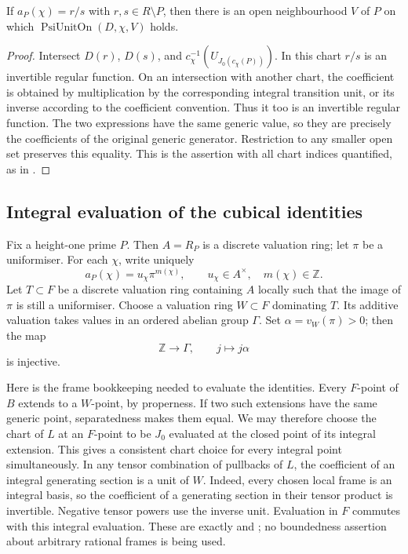 \begin{srlemma}
\label{lem:psi-near-unit}
If \(a_P(\chi)=r/s\) with \(r,s\in R\setminus P\), then there is an
open neighbourhood \(V\) of \(P\) on which
\(\operatorname{PsiUnitOn}(D,\chi,V)\) holds.
\end{srlemma}
\begin{proof}
Intersect \(D(r)\), \(D(s)\), and
\(c_\chi^{-1}(U_{J_0(c_\chi(P))})\).  In this chart \(r/s\) is an
invertible regular function.  On an intersection with another chart,
the coefficient is obtained by multiplication by the corresponding
integral transition unit, or its inverse according to the coefficient
convention.  Thus it too is an invertible regular function.
The two expressions have the same generic value, so they are precisely
the coefficients of the original generic generator.
Restriction to any smaller open set preserves this equality.  This is
the assertion with all chart indices quantified, as in
.
\end{proof}

\subsection{Integral evaluation of the cubical identities}
Fix a height-one prime \(P\).  Then \(A=R_P\) is a discrete valuation
ring; let \(\pi\) be a uniformiser.  For each \(\chi\), write uniquely
\[
             a_P(\chi)=u_\chi\pi^{m(\chi)},\qquad
             u_\chi\in A^\times,\quad m(\chi)\in\mathbb Z .
 \tag{PU2}\label{eq:psi-valuations}
\]
Let \(T\subset F\) be a discrete valuation ring containing \(A\) locally
such that the image of \(\pi\) is still a uniformiser.
Choose a valuation ring \(W\subset F\) dominating \(T\).  Its additive
valuation takes values in an ordered abelian group \(\Gamma\).
Set \(\alpha=v_W(\pi)>0\); then the map
\[
                   \mathbb Z\longrightarrow\Gamma,\qquad
                   j\longmapsto j\alpha
 \tag{PU3}\label{eq:psi-injective-value}
\]
is injective.

Here is the frame bookkeeping needed to evaluate the identities.
Every \(F\)-point of \(B\) extends to a \(W\)-point, by properness.
If two such extensions have the same generic point, separatedness
makes them equal.  We may therefore choose the chart of \(L\) at an
\(F\)-point to be \(J_0\) evaluated at the closed point of its integral
extension.  This gives a consistent chart choice for every integral
point simultaneously.  In any tensor combination of pullbacks of \(L\),
the coefficient of an integral generating section is a unit of \(W\).
Indeed, every chosen local frame is an integral basis, so the
coefficient of a generating section in their tensor product is
invertible.  Negative tensor powers use the inverse unit.  Evaluation
in \(F\) commutes with this integral evaluation.  These are exactly
 and ; no boundedness
assertion about arbitrary rational frames is being used.

